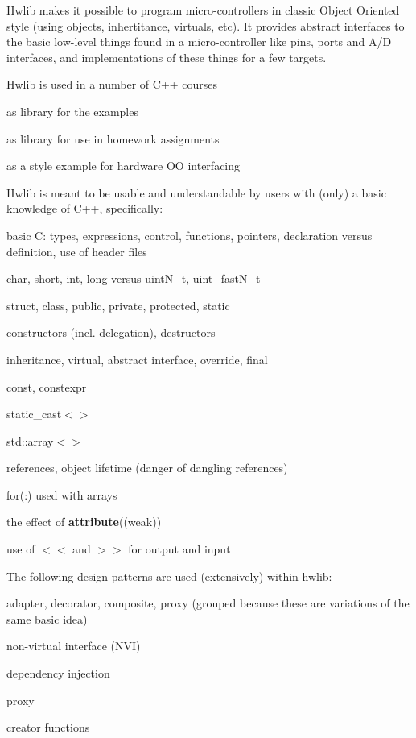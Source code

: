 Hwlib makes it possible to program micro-\/controllers in classic Object Oriented style (using objects, inhertitance, virtuals, etc). It provides abstract interfaces to the basic low-\/level things found in a micro-\/controller like pins, ports and A/D interfaces, and implementations of these things for a few targets.

Hwlib is used in a number of C++ courses
\begin{DoxyItemize}
\item as library for the examples
\item as library for use in homework assignments
\item as a style example for hardware OO interfacing
\end{DoxyItemize}

Hwlib is meant to be usable and understandable by users with (only) a basic knowledge of C++, specifically\+:
\begin{DoxyItemize}
\item basic C\+: types, expressions, control, functions, pointers, declaration versus definition, use of header files
\item char, short, int, long versus uint\+N\+\_\+t, uint\+\_\+fast\+N\+\_\+t
\item struct, class, public, private, protected, static
\item constructors (incl. delegation), destructors
\item inheritance, virtual, abstract interface, override, final
\item const, constexpr
\item static\+\_\+cast$<$$>$
\item std\+::array$<$$>$
\item references, object lifetime (danger of dangling references)
\item for(\+:) used with arrays
\item the effect of {\bfseries attribute}((weak))
\item use of $<$$<$ and $>$$>$ for output and input
\end{DoxyItemize}

The following design patterns are used (extensively) within hwlib\+:
\begin{DoxyItemize}
\item adapter, decorator, composite, proxy (grouped because these are variations of the same basic idea)
\item non-\/virtual interface (N\+VI)
\item dependency injection
\item proxy
\item creator functions
\end{DoxyItemize}

